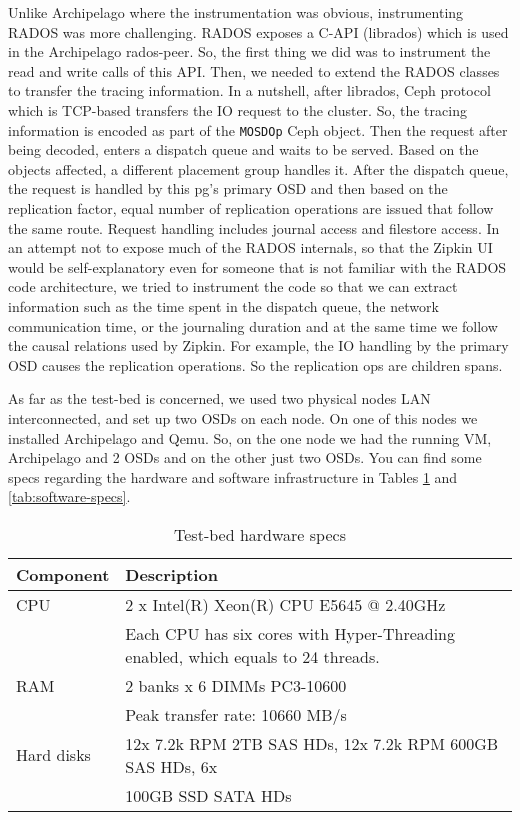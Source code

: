 Unlike Archipelago where the instrumentation was obvious, instrumenting RADOS
was more challenging. RADOS exposes a C-API (librados) which is used in the
Archipelago rados-peer. So, the first thing we did was to instrument the read
and write calls of this API. Then, we needed to extend the RADOS classes to
transfer the tracing information. In a nutshell, after librados, Ceph protocol
which is TCP-based transfers the IO request to the cluster. So, the tracing
information is encoded as part of the \texttt{MOSDOp} Ceph object. Then the
request after being decoded, enters a dispatch queue and waits to be served.
Based on the objects affected, a different placement group handles it. After the
dispatch queue, the request is handled by this pg's primary OSD and then based
on the replication factor, equal number of replication operations are issued
that follow the same route. Request handling includes journal access and
filestore access. In an attempt not to expose much of the RADOS internals, so
that the Zipkin UI would be self-explanatory even for someone that is not
familiar with the RADOS code architecture, we tried to instrument the code so
that we can extract information such as the time spent in the dispatch queue,
the network communication time, or the journaling duration and at the same time
we follow the causal relations used by Zipkin. For example, the IO handling by
the primary OSD causes the replication operations. So the replication ops are
children spans.

As far as the test-bed is concerned, we used two physical nodes LAN
interconnected, and set up two OSDs on each node. On one of this nodes we
installed Archipelago and Qemu. So, on the one node we had the running VM,
Archipelago and 2 OSDs and on the other just two OSDs. You can find some specs
regarding the hardware and software infrastructure in Tables
\ref{tab:hardware-specs} and \ref{tab:software-specs}. 

\begin{table}[H]
    \centering
    \begin{tabular}{ | l | l | }
        \hline
        Component & Description \\ \hline \hline
        CPU &  2 x Intel(R) Xeon(R) CPU E5645 @ 2.40GHz \cite{e5645} \\
         & Each CPU has six cores with Hyper-Threading enabled, which equals to 
         24 threads. \\ \hline
        RAΜ & 2 banks x 6 DIMMs PC3-10600 \\
        & Peak transfer rate: 10660 MB/s \\ \hline
        Hard disks & 12x 7.2k RPM 2TB SAS HDs, 12x 7.2k RPM 600GB SAS HDs, 6x \\
        & 100GB SSD SATA HDs \\ \hline
    \end{tabular}
    \caption{Test-bed hardware specs}
    \label{tab:hardware-specs}
\end{table}

